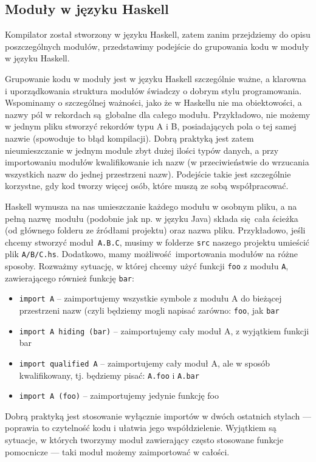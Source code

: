 \subsection{Moduły w języku Haskell}
Kompilator został stworzony w języku Haskell, zatem zanim przejdziemy do opisu poszczególnych modułów, przedstawimy podejście do grupowania kodu w moduły w języku Haskell.

Grupowanie kodu w moduły jest w języku Haskell szczególnie ważne, a klarowna i uporządkowania struktura modułów świadczy o dobrym stylu programowania. Wspominamy o szczególnej ważności, jako że w Haskellu nie ma obiektowości, a nazwy pól w rekordach są globalne dla całego modułu. Przykładowo, nie możemy w jednym pliku stworzyć rekordów typu A i B, posiadających pola o tej samej nazwie (spowoduje to błąd kompilacji). Dobrą praktyką jest zatem nieumieszczanie w jednym module zbyt dużej ilości typów danych, a przy importowaniu modułów kwalifikowanie ich nazw (w przeciwieństwie do wrzucania wszystkich nazw do jednej przestrzeni nazw). Podejście takie jest szczególnie korzystne, gdy kod tworzy więcej osób, które muszą ze sobą współpracować.

Haskell wymusza na nas umieszczanie każdego modułu w osobnym pliku, a na pełną nazwę modułu (podobnie jak np. w języku Java) składa się cała ścieżka (od głównego folderu ze źródłami projektu) oraz nazwa pliku. Przykładowo, jeśli chcemy stworzyć moduł \texttt{A.B.C}, musimy w folderze \texttt{src} naszego projektu umieścić plik \texttt{A/B/C.hs}. Dodatkowo, mamy możliwość importowania modułów na różne sposoby. Rozważmy sytuację, w której chcemy użyć funkcji \texttt{foo} z modułu \texttt{A}, zawierającego również funkcję \texttt{bar}:
\begin{itemize}
  \item \texttt{import A} -- zaimportujemy wszystkie symbole z modułu A do bieżącej przestrzeni nazw (czyli będziemy mogli napisać zarówno: \texttt{foo}, jak \texttt{bar}
  \item \texttt{import A hiding (bar)} -- zaimportujemy cały moduł A, z wyjątkiem funkcji bar
  \item \texttt{import qualified A} -- zaimportujemy cały moduł A, ale w sposób kwalifikowany, tj. będziemy pisać: \texttt{A.foo} i \texttt{A.bar}
  \item \texttt{import A (foo)} -- zaimportujemy jedynie funkcję foo
\end{itemize}

Dobrą praktyką jest stosowanie wyłącznie importów w dwóch ostatnich stylach --- poprawia to czytelność kodu i ułatwia jego współdzielenie. Wyjątkiem są sytuacje, w których tworzymy moduł zawierający często stosowane funkcje pomocnicze --- taki moduł możemy zaimportować w całości.

